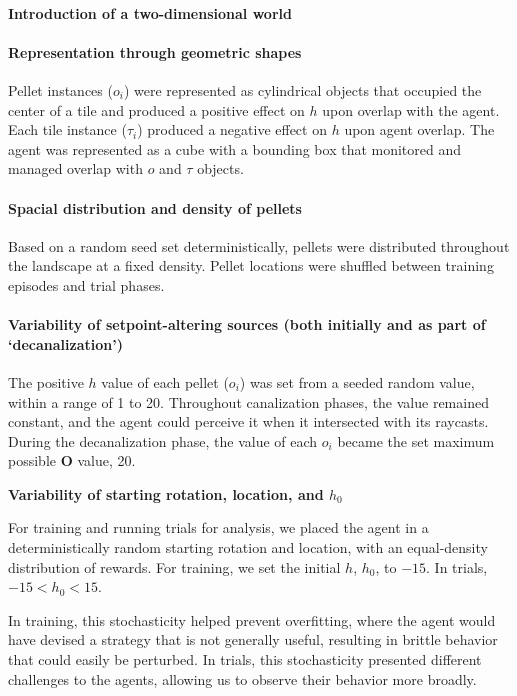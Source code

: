 \paragraph{Introduction of a two-dimensional world}

\paragraph{Representation through geometric shapes}

Pellet instances (\(o_i\)) were represented as cylindrical objects that occupied the center of a tile and produced a positive effect on \(h\) upon overlap with the agent. Each tile instance (\(\tau_i\)) produced a negative effect on \(h\) upon agent overlap. The agent was represented as a cube with a bounding box that monitored and managed overlap with \(o\) and \(\tau\) objects.

\paragraph{Spacial distribution and density of pellets}

Based on a random seed set deterministically, pellets were distributed throughout the landscape at a fixed density. Pellet locations were shuffled between training episodes and trial phases.

\paragraph{Variability of setpoint-altering sources (both initially and as part of ‘decanalization’)}

The positive \(h\) value of each pellet (\(o_i\)) was set from a seeded random value, within a range of 1 to 20. Throughout canalization phases, the value remained constant, and the agent could perceive it when it intersected with its raycasts. During the decanalization phase, the value of each \(o_i\) became the set maximum possible \(\mathbf{O}\) value, 20.

\textbf{Variability of starting rotation, location, and \(h_0\)}

For training and running trials for analysis, we placed the agent in a deterministically random starting rotation and location, with an equal-density distribution of rewards. For training, we set the initial \(h\), \(h_0\), to \(-15\). In trials, \(-15 < h_0 < 15\). 

In training, this stochasticity helped prevent overfitting, where the agent would have devised a strategy that is not generally useful, resulting in brittle behavior that could easily be perturbed. In trials, this stochasticity presented different challenges to the agents, allowing us to observe their behavior more broadly. 


